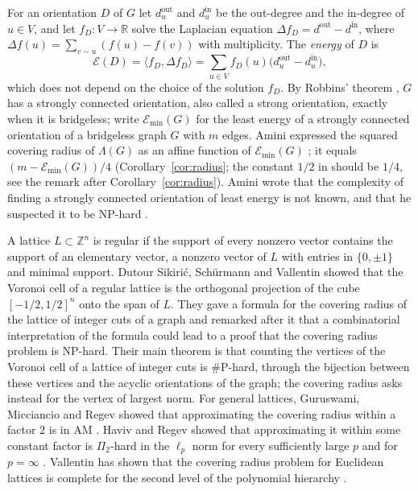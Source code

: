\documentclass[11pt]{amsart}
\theoremstyle{definition}
\theoremstyle{remark}
\numberwithin{equation}{section}
\newcommand{\Emin}{\mathcal E_{\min}}
\newcommand{\Z}{\mathbb Z}
\newcommand{\R}{\mathbb R}
\begin{document}
For an orientation $D$ of $G$ let $d^{\mathrm{out}}_u$ and $d^{\mathrm{in}}_u$ be the out-degree and the in-degree of $u\in V$, and let $f_D\colon V\to\R$ solve the Laplacian equation $\Delta f_D=d^{\mathrm{out}}-d^{\mathrm{in}}$, where $\Delta f(u)=\sum_{v\sim u}(f(u)-f(v))$ with multiplicity. The \emph{energy} of $D$ is
\[
\mathcal E(D)=\langle f_D,\Delta f_D\rangle=\sum_{u\in V}f_D(u)\bigl(d^{\mathrm{out}}_u-d^{\mathrm{in}}_u\bigr),
\]
which does not depend on the choice of the solution $f_D$. By Robbins' theorem \cite{Robbins39}, $G$ has a strongly connected orientation, also called a strong orientation, exactly when it is bridgeless; write $\Emin(G)$ for the least energy of a strongly connected orientation of a bridgeless graph $G$ with $m$ edges. Amini expressed the squared covering radius of $\Lambda(G)$ as an affine function of $\Emin(G)$ \cite[Definition--Theorem~14]{Amini}; it equals $(m-\Emin(G))/4$ (Corollary~\ref{cor:radius}; the constant $1/2$ in \cite[Definition--Theorem~14]{Amini} should be $1/4$, see the remark after Corollary~\ref{cor:radius}). Amini wrote that the complexity of finding a strongly connected orientation of least energy is not known, and that he suspected it to be NP-hard \cite[\S4]{Amini}.

A lattice $L\subset\Z^n$ is regular if the support of every nonzero vector contains the support of an elementary vector, a nonzero vector of $L$ with entries in $\{0,\pm1\}$ and minimal support. Dutour Sikiri\'c, Sch\"urmann and Vallentin \cite[Theorem~2]{DSV09} showed that the Voronoi cell of a regular lattice is the orthogonal projection of the cube $[-1/2,1/2]^n$ onto the span of $L$. They gave a formula for the covering radius of the lattice of integer cuts of a graph \cite[Proposition~3]{DSV09} and remarked after it that a combinatorial interpretation of the formula could lead to a proof that the covering radius problem is NP-hard. Their main theorem \cite[Theorem~1]{DSV09} is that counting the vertices of the Voronoi cell of a lattice of integer cuts is \#P-hard, through the bijection between these vertices and the acyclic orientations of the graph; the covering radius asks instead for the vertex of largest norm. For general lattices, Guruswami, Micciancio and Regev showed that approximating the covering radius within a factor $2$ is in AM \cite{GMR05}. Haviv and Regev showed that approximating it within some constant factor is $\Pi_2$-hard in the $\ell_p$ norm for every sufficiently large $p$ and for $p=\infty$ \cite{HR06}. Vallentin has shown that the covering radius problem for Euclidean lattices is complete for the second level of the polynomial hierarchy \cite{Vallentin26}.
\end{document}
